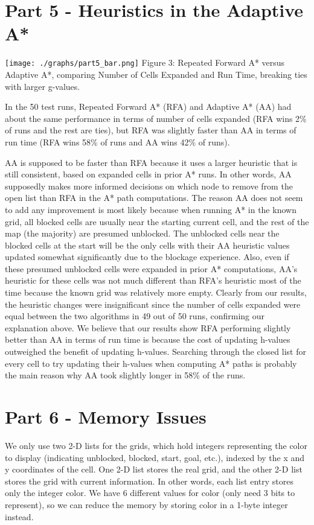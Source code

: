 \documentclass[10pt,a4paper]{article}
\begin{document}
\section*{Part 5 - Heuristics in the Adaptive A*}
\begin{center}
\texttt{[image: ./graphs/part5\_bar.png]}
\newline
Figure 3: Repeated Forward A* versus Adaptive A*, comparing Number of Cells Expanded and Run Time, breaking ties with larger g-values.
\newline
\end{center}

In the 50 test runs, Repeated Forward A* (RFA) and Adaptive A* (AA) had about the same performance in terms of number of cells expanded (RFA wins 2\% of runs and the rest are ties), but RFA was slightly faster than AA in terms of run time (RFA wins 58\% of runs and AA wins 42\% of runs).

AA is supposed to be faster than RFA because it uses a larger heuristic that is still consistent, based on expanded cells in prior A* runs. In other words, AA supposedly makes more informed decisions on which node to remove from the open list than RFA in the A* path computations. The reason AA does not seem to add any improvement is most likely because when running A* in the known grid, all blocked cells are usually near the starting current cell, and the rest of the map (the majority) are presumed unblocked. The unblocked cells near the blocked cells at the start will be the only cells with their AA heuristic values updated somewhat significantly due to the blockage experience. Also, even if these presumed unblocked cells were expanded in prior A* computations, AA's heuristic for these cells was not much different than RFA's heuristic most of the time because the known grid was relatively more empty. Clearly from our results, the heuristic changes were insignificant since the number of cells expanded were equal between the two algorithms in 49 out of 50 runs, confirming our explanation above.
\newline\newline
We believe that our results show RFA performing slightly better than AA in terms of run time is because the cost of updating h-values outweighed the benefit of updating h-values. Searching through the closed list for every cell to try updating their h-values when computing A* paths is probably the main reason why AA took slightly longer in 58\% of the runs.
\section*{Part 6 - Memory Issues}
We only use two 2-D lists for the grids, which hold integers representing the color to display (indicating unblocked, blocked, start, goal, etc.), indexed by the x and y coordinates of the cell. One 2-D list stores the real grid, and the other 2-D list stores the grid with current information. In other words, each list entry stores only the integer color. We have 6 different values for color (only need 3 bits to represent), so we can reduce the memory by storing color in a 1-byte integer instead.
\end{document}

